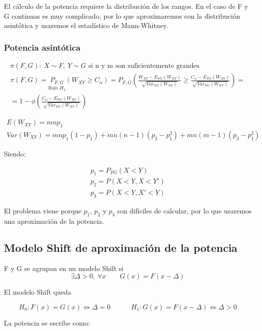 El cálculo de la potencia requiere la distribución de los rangos. En el caso de F y G continuas es muy complicado, por lo que aproximaremos con la distribución asintótica y usaremos el estadístico de Mann-Whitney.

\subsubsection{Potencia asintótica}
$$
\begin{array}{c}
    \pi(F,G):\ X\sim F,\ Y\sim G\text{ si n y m son suficientemente grandes} \\
    \pi(F,G)=\underset{\text{Bajo }H_1}{P_{F,G}}(W_{XY}\geq C_\alpha)=P_{F,G}\left(\frac{W_{XY}-E_{FG}(W_{XY})}{\sqrt{Var_{FG}(W_{XY})}}\geq \frac{C_\alpha-E_{FG}(W_{XY})}{\sqrt{Var_{FG}(W_{XY})}}\right)=\\
    =1-\phi\left(\frac{C_\alpha-E_{FG}(W_{XY})}{\sqrt{Var_{FG}(W_{XY})}}\right)
\end{array}
$$

$$
\begin{array}{c}
    E(W_{XY})=mnp_1\\
    Var(W_{XY})=mnp_1(1-p_1)+mn(n-1)(p_2-p_1^2)+mn(m-1)(p_3-p_1^2)
\end{array}
$$

Siendo:

$$
\begin{array}{c}
    p_1=P_{FG}(X<Y)\\
    p_2=P(X<Y,X<Y')\\
    p_3=P(X<Y,X'<Y)
\end{array}
$$

El problema viene porque $p_1$, $p_2$ y $p_3$ son difíciles de calcular, por lo que usaremos una aproximación de la potencia.

\subsection{Modelo Shift de aproximación de la potencia}

\begin{theorem}
    F y G se agrupan en un modelo Shift si
    $$
    \exists\Delta>0,\ \forall x\quad\quad G(x)=F(x-\Delta)
    $$
\end{theorem}

El modelo Shift queda

$$
H_0:F(x)=G(x)\iff\Delta=0\quad\quad\quad H_1:G(x)=F(x-\Delta)\iff\Delta>0
$$

La potencia se escribe como:

